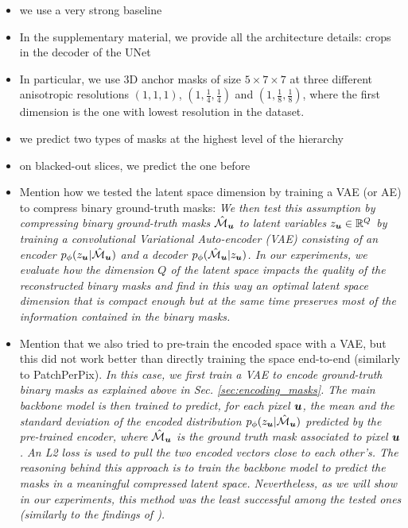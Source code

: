 \begin{itemize}
\item we use a very strong baseline
\item In the supplementary material, we provide all the architecture details: crops in the decoder of the UNet
\item In particular, we use 3D anchor masks of size $5\times 7 \times 7$ at three different anisotropic resolutions $(1,1,1)$, $(1,\frac{1}{4},\frac{1}{4})$ and $(1,\frac{1}{8},\frac{1}{8})$, where the first dimension is the one with lowest resolution in the dataset.
\item we predict two types of \maskname masks at the highest level of the hierarchy
\item on blacked-out slices, we predict the one before
\item Mention how we tested the latent space dimension by training a VAE (or AE) to compress binary ground-truth \maskname masks: \emph{We then test this assumption by compressing binary ground-truth \maskname masks $\hat{\mathcal{M}}_{\coord{u}}$ to latent variables $z_{\coord{u}}\in \mathbb{R}^Q$ by training a convolutional Variational Auto-encoder (VAE) \cite{kingma2013auto,rezende2014stochastic} consisting of an encoder $p_{\phi}(z_{\coord{u}}|\hat{\mathcal{M}}_{\coord{u}})$ and a decoder $p_{\phi}(\hat{\mathcal{M}}_{\coord{u}}|z_{\coord{u}})$.
In our experiments, we evaluate how the dimension $Q$ of the latent space impacts the quality of the reconstructed binary masks and find in this way an optimal latent space dimension that is compact enough but at the same time preserves most of the information contained in the binary masks.}
\item Mention that we also tried to pre-train the encoded space with a VAE, but this did not work better than directly training the space end-to-end (similarly to PatchPerPix). 
\emph{In this case, we first train a VAE to encode ground-truth binary masks as explained above in Sec. \ref{sec:encoding_masks}. 
The main backbone model is then trained to predict, for each pixel $\coord{u}$, the mean and the standard deviation of the encoded distribution $p_{\phi}(z_{\coord{u}}|\hat{\mathcal{M}}_{\coord{u}})$ predicted by the pre-trained encoder, where $\hat{\mathcal{M}}_{\coord{u}}$ is the ground truth \maskname mask associated to pixel $\coord{u}$. An L2 loss is used to pull the two encoded vectors close to each other's. 
The reasoning behind this approach is to train the backbone model to predict the masks in a meaningful compressed latent space. 
Nevertheless, as we will show in our experiments, this method was the least successful among the tested ones (\emph{similarly to the findings of \cite{hirsch2020patchperpix}}).}

\end{itemize}
